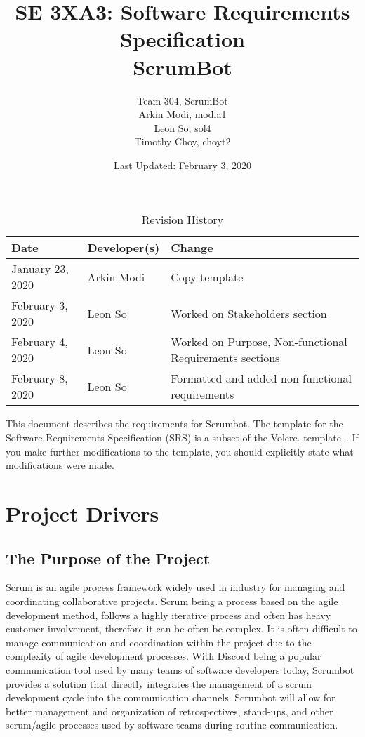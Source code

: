 \documentclass[12pt, titlepage]{article}
\title{SE 3XA3: Software Requirements Specification\\ScrumBot}
\author{
    Team 304, ScrumBot
        \\ Arkin Modi, modia1
        \\ Leon So, sol4
        \\ Timothy Choy, choyt2
}
\date{Last Updated: February 3, 2020}
\begin{document}
\maketitle

\tableofcontents
\listoftables
\listoffigures

\begin{table}[bp]
    \caption{Revision History} \label{TblRevisionHistory}
    \begin{tabularx}{\textwidth}{llX}
        \toprule
            \textbf{Date} & \textbf{Developer(s)} & \textbf{Change}\\
        \midrule
            January 23, 2020 & Arkin Modi & Copy template\\
            February 3, 2020 & Leon So & Worked on Stakeholders section\\
            February 4, 2020 & Leon So & Worked on Purpose, Non-functional Requirements sections\\
            February 8, 2020 & Leon So & Formatted and added non-functional requirements\\
        \bottomrule
    \end{tabularx}
\end{table}

\newpage


This document describes the requirements for Scrumbot.  The template for the Software
Requirements Specification (SRS) is a subset of the Volere.
template~\citep{RobertsonAndRobertson2012}.  If you make further modifications
to the template, you should explicitly state what modifications were made.

\section{Project Drivers}

\subsection{The Purpose of the Project}
Scrum is an agile process framework widely used in industry for managing and coordinating collaborative projects. Scrum being a process based on the agile development method, follows a highly iterative process and often has heavy customer involvement, therefore it can be often be complex. It is often difficult to manage communication and coordination within the project due to the complexity of agile development processes. With Discord being a popular communication tool used by many teams of software developers today, Scrumbot provides a solution that directly integrates the management of a scrum development cycle into the communication channels. Scrumbot will allow for better management and organization of retrospectives, stand-ups, and other scrum/agile processes used by software teams during routine communication.\\
\end{document}
